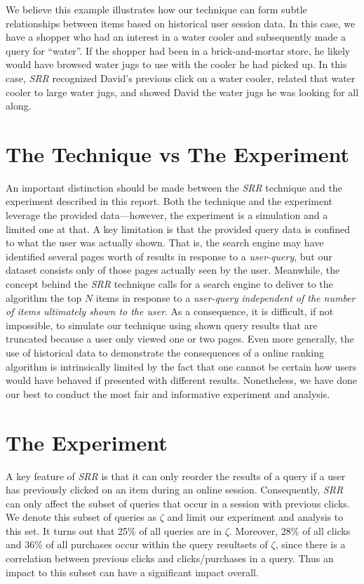 \documentclass{article}
\begin{document}
We believe this example illustrates how our technique can form subtle
relationships between items based on historical user session data. In this case,
we have a shopper who had an interest in a water cooler and subsequently made a
query for ``water''. If the shopper had been in a brick-and-mortar store, he
likely would have browsed water jugs to use with the cooler he had picked up. In
this case, {\em SRR} recognized David's previous click on a water cooler,
related that water cooler to large water jugs, and showed David the water jugs
he was looking for all along.

\section{The Technique vs The Experiment}

An important distinction should be made between the {\em SRR} technique and the
experiment described in this report. Both the technique and the experiment
leverage the provided data---however, the experiment is a simulation and a
limited one at that. A key limitation is that the provided query data is
confined to what the user was actually shown. That is, the search engine may
have identified several pages worth of results in response to a {\em
user-query}, but our dataset consists only of those pages actually seen by the
user.  Meanwhile, the concept behind the {\em SRR} technique calls for a search
engine to deliver to the algorithm the top $N$ items in response to a {\em
user-query} {\em independent of the number of items ultimately shown to the
user}. As a consequence, it is difficult, if not impossible, to simulate our
technique using shown query results that are truncated because a user only
viewed one or two pages.  Even more generally, the use of historical data to
demonstrate the consequences of a online ranking algorithm is intrinsically
limited by the fact that one cannot be certain how users would have behaved if
presented with different results. Nonetheless, we have done our best to conduct
the most fair and informative experiment and analysis.

\section{The Experiment}\label{sec:experiment}
A key feature of {\em SRR} is that it can only reorder the results of a query if
a user has previously clicked on an item during an online session.
Consequently, {\em SRR} can only affect the subset of queries that occur in a
session with previous clicks. We denote this subset of queries as $\zeta$ and
limit our experiment and analysis to this set. It turns out that 25\% of all
queries are in $\zeta$. Moreover, 28\% of all clicks and 36\% of all purchases
occur within the query resultsets of $\zeta$, since there is a correlation
between previous clicks and clicks/purchases in a query.  Thus an impact to this
subset can have a significant impact overall.
\end{document}
